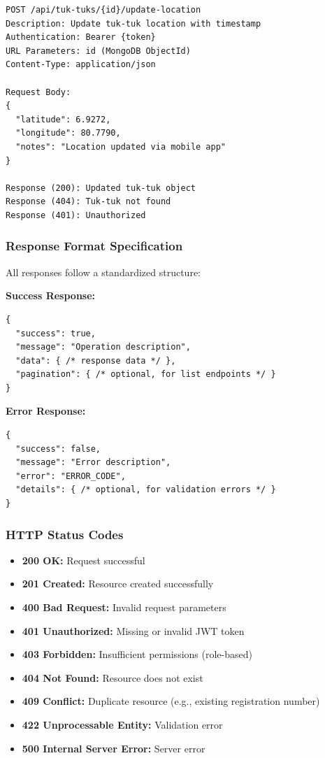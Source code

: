 \documentclass[12pt,a4paper]{article}
\begin{document}
\begin{verbatim}
POST /api/tuk-tuks/{id}/update-location
Description: Update tuk-tuk location with timestamp
Authentication: Bearer {token}
URL Parameters: id (MongoDB ObjectId)
Content-Type: application/json

Request Body:
{
  "latitude": 6.9272,
  "longitude": 80.7790,
  "notes": "Location updated via mobile app"
}

Response (200): Updated tuk-tuk object
Response (404): Tuk-tuk not found
Response (401): Unauthorized
\end{verbatim}

\subsubsection*{Response Format Specification}

All responses follow a standardized structure:

\textbf{Success Response:}
\begin{verbatim}
{
  "success": true,
  "message": "Operation description",
  "data": { /* response data */ },
  "pagination": { /* optional, for list endpoints */ }
}
\end{verbatim}

\textbf{Error Response:}
\begin{verbatim}
{
  "success": false,
  "message": "Error description",
  "error": "ERROR_CODE",
  "details": { /* optional, for validation errors */ }
}
\end{verbatim}

\subsubsection*{HTTP Status Codes}

\begin{itemize}
  \item \textbf{200 OK:} Request successful
  \item \textbf{201 Created:} Resource created successfully
  \item \textbf{400 Bad Request:} Invalid request parameters
  \item \textbf{401 Unauthorized:} Missing or invalid JWT token
  \item \textbf{403 Forbidden:} Insufficient permissions (role-based)
  \item \textbf{404 Not Found:} Resource does not exist
  \item \textbf{409 Conflict:} Duplicate resource (e.g., existing registration number)
  \item \textbf{422 Unprocessable Entity:} Validation error
  \item \textbf{500 Internal Server Error:} Server error
\end{itemize}
\end{document}

